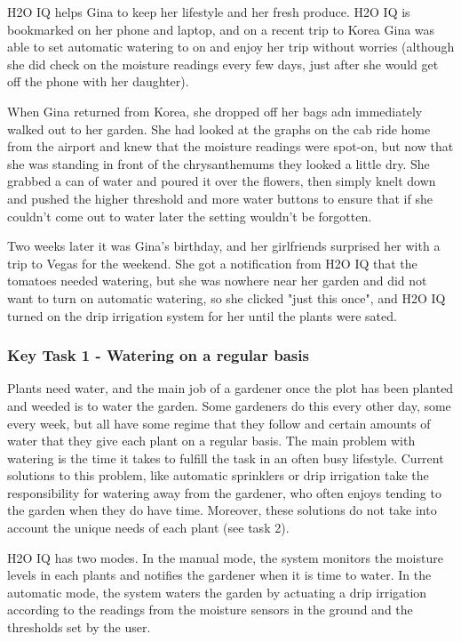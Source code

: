 \documentclass[11pt]{article}
\begin{document}
H2O IQ helps Gina to keep her lifestyle and her fresh produce.  H2O IQ is bookmarked on her phone and laptop, and on a recent trip to Korea Gina was able to set automatic watering to on and enjoy her trip without worries (although she did check on the moisture readings every few days, just after she would get off the phone with her daughter).

When Gina returned from Korea, she dropped off her bags adn immediately walked out to her garden.  She had looked at the graphs on the cab ride home from the airport and knew that the moisture readings were spot-on, but now that she was standing in front of the chrysanthemums they looked a little dry.  She grabbed a can of water and poured it over the flowers, then simply knelt down and pushed the higher threshold and more water buttons to ensure that if she couldn't come out to water later the setting wouldn't be forgotten.

Two weeks later it was Gina's birthday, and her girlfriends surprised her with a trip to Vegas for the weekend.  She got a notification from H2O IQ that the tomatoes needed watering, but she was nowhere near her garden and did not want to turn on automatic watering, so she clicked "just this once", and H2O IQ turned on the drip irrigation system for her until the plants were sated.

\subsubsection{Key Task 1 - Watering on a regular basis}
Plants need water, and the main job of a gardener once the plot has been planted and weeded is to water the garden. Some gardeners do this every other day, some every week, but all have some regime that they follow and certain amounts of water that they give each plant on a regular basis. The main problem with watering is the time it takes to fulfill the task in an often busy lifestyle. Current solutions to this problem, like automatic sprinklers or drip irrigation take the responsibility for watering away from the gardener, who often enjoys tending to the garden when they do have time. Moreover, these solutions do not take into account the unique needs of each plant (see task 2).

H2O IQ has two modes. In the manual mode, the system monitors the moisture levels in each plants and notifies the gardener when it is time to water. In the automatic mode, the system waters the garden by actuating a drip irrigation according to the readings from the moisture sensors in the ground and the thresholds set by the user.
\end{document}
